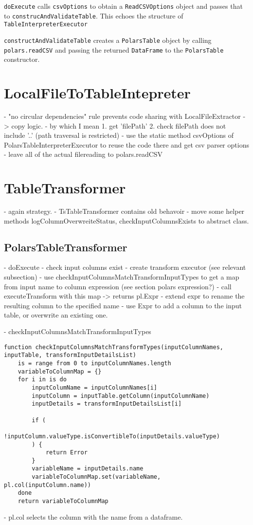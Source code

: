 \Verb|doExecute| calls \Verb|csvOptions| to obtain a \Verb|ReadCSVOptions| object and passes that to \Verb|construcAndValidateTable|.
This echoes the structure of \Verb|TableInterpreterExecutor| %

\Verb|constructAndValidateTable| creates a \Verb|PolarsTable| object by calling \Verb|polars.readCSV| and passing the returned \Verb|DataFrame| to the \Verb|PolarsTable| constructor.

\section{LocalFileToTableIntepreter}
- "no circular dependencies" rule prevents code sharing with LocalFileExtractor -> copy logic.
- by which I mean 1. get 'filePath' 2. check filePath does not include '..' (path traversal is restricted)
- use the static method csvOptions of PolarsTableInterpreterExecutor to reuse the code there and get csv parser options
- leave all of the actual filereading to polars.readCSV


\section{TableTransformer}
- again strategy.
- TsTableTransformer contains old behavoir
- move some helper methods logColumnOverwreiteStatus, checkInputColumnsExists to abstract class.

\subsection{PolarsTableTransformer}
- doExecute
- check input columns exist
- create transform executor (see relevant subsection)
- use checkInputColumnsMatchTransformInputTypes to get a map from input name to column expression (see section polars expression?)
- call executeTransform with this map -> returns pl.Expr
- extend expr to rename the resulting column to the specified name
- use Expr to add a column to the input table, or overwrite an existing one.


- checkInputColumnsMatchTransformInputTypes
\begin{listing}
	\begin{verbatim}
function checkInputColumnsMatchTransformTypes(inputColumnNames, inputTable, transformInputDetailsList)
	is = range from 0 to inputColumnNames.length
	variableToColumnMap = {}
	for i in is do
		inputColumName = inputColumnNames[i]
		inputColumn = inputTable.getColumn(inputColumnName)
		inputDetails = transformInputDetailsList[i]

		if (
			!inputColumn.valueType.isConvertibleTo(inputDetails.valueType)
		) {
			return Error
		}
		variableName = inputDetails.name
		variableToColumnMap.set(variableName, pl.col(inputColumn.name))
	done
	return variableToColumnMap
	\end{verbatim}
\end{listing}
- pl.col selects the column with the name from a dataframe.


